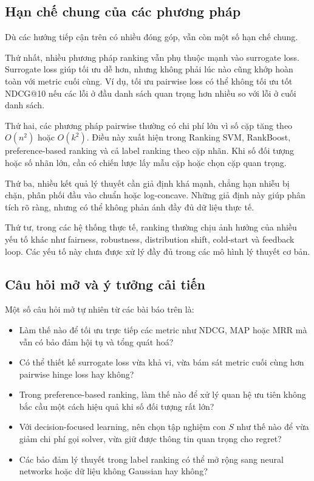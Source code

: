 \subsection{Hạn chế chung của các phương pháp}

Dù các hướng tiếp cận trên có nhiều đóng góp, vẫn còn một số hạn chế chung.

Thứ nhất, nhiều phương pháp ranking vẫn phụ thuộc mạnh vào surrogate loss. Surrogate loss giúp tối ưu dễ hơn, nhưng không phải lúc nào cũng khớp hoàn toàn với metric cuối cùng. Ví dụ, tối ưu pairwise loss có thể không tối ưu tốt NDCG@10 nếu các lỗi ở đầu danh sách quan trọng hơn nhiều so với lỗi ở cuối danh sách.

Thứ hai, các phương pháp pairwise thường có chi phí lớn vì số cặp tăng theo \(O(n^2)\) hoặc \(O(k^2)\). Điều này xuất hiện trong Ranking SVM, RankBoost, preference-based ranking và cả label ranking theo cặp nhãn. Khi số đối tượng hoặc số nhãn lớn, cần có chiến lược lấy mẫu cặp hoặc chọn cặp quan trọng.

Thứ ba, nhiều kết quả lý thuyết cần giả định khá mạnh, chẳng hạn nhiễu bị chặn, phân phối đầu vào chuẩn hoặc log-concave. Những giả định này giúp phân tích rõ ràng, nhưng có thể không phản ánh đầy đủ dữ liệu thực tế.

Thứ tư, trong các hệ thống thực tế, ranking thường chịu ảnh hưởng của nhiều yếu tố khác như fairness, robustness, distribution shift, cold-start và feedback loop. Các yếu tố này chưa được xử lý đầy đủ trong các mô hình lý thuyết cơ bản.

\subsection{Câu hỏi mở và ý tưởng cải tiến}

Một số câu hỏi mở tự nhiên từ các bài báo trên là:

\begin{itemize}
    \item Làm thế nào để tối ưu trực tiếp các metric như NDCG, MAP hoặc MRR mà vẫn có bảo đảm hội tụ và tổng quát hoá?
    \item Có thể thiết kế surrogate loss vừa khả vi, vừa bám sát metric cuối cùng hơn pairwise hinge loss hay không?
    \item Trong preference-based ranking, làm thế nào để xử lý quan hệ ưu tiên không bắc cầu một cách hiệu quả khi số đối tượng rất lớn?
    \item Với decision-focused learning, nên chọn tập nghiệm con \(S\) như thế nào để vừa giảm chi phí gọi solver, vừa giữ được thông tin quan trọng cho regret?
    \item Các bảo đảm lý thuyết trong label ranking có thể mở rộng sang neural networks hoặc dữ liệu không Gaussian hay không?
\end{itemize}

